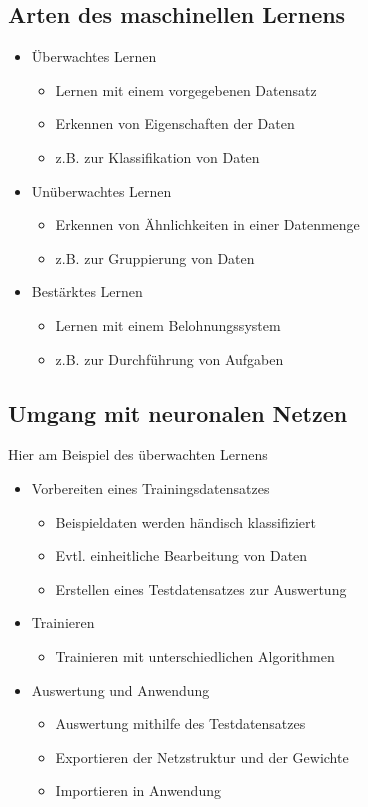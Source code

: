 \documentclass[
	aspectratio=169,
	8pt
]{beamer}
\begin{document}
\subsection{Arten des maschinellen Lernens}
\begin{frame}[t]{\insertsubsection}
\begin{itemize}
\item Überwachtes Lernen
\begin{itemize}
\item Lernen mit einem vorgegebenen Datensatz
\item Erkennen von Eigenschaften der Daten
\item z.B. zur Klassifikation von Daten
\end{itemize}
\item Unüberwachtes Lernen
\begin{itemize}
\item Erkennen von Ähnlichkeiten in einer Datenmenge
\item z.B. zur Gruppierung von Daten
\end{itemize}
\item Bestärktes Lernen
\begin{itemize}
\item Lernen mit einem Belohnungssystem
\item z.B. zur Durchführung von Aufgaben
\end{itemize}
\end{itemize}
\end{frame}

\subsection{Umgang mit neuronalen Netzen}
\begin{frame}[t]{\insertsubsection}
Hier am Beispiel des überwachten Lernens
\begin{itemize}
\item Vorbereiten eines Trainingsdatensatzes
\begin{itemize}
\item Beispieldaten werden händisch klassifiziert
\item Evtl. einheitliche Bearbeitung von Daten
\item Erstellen eines Testdatensatzes zur Auswertung
\end{itemize}
\item Trainieren
\begin{itemize}
\item Trainieren mit unterschiedlichen Algorithmen
\end{itemize}
\item Auswertung und Anwendung
\begin{itemize}
\item Auswertung mithilfe des Testdatensatzes
\item Exportieren der Netzstruktur und der Gewichte
\item Importieren in Anwendung
\end{itemize}
\end{itemize}
\end{frame}
\end{document}
